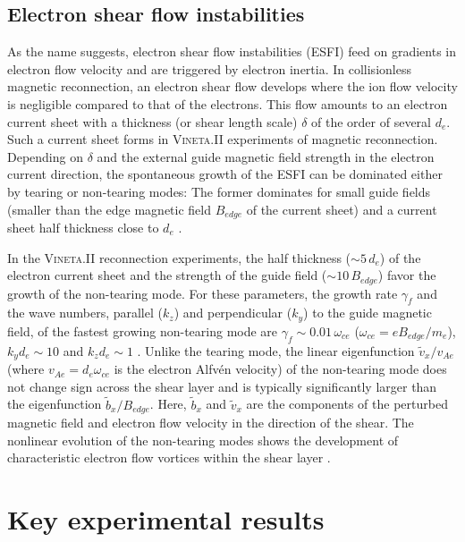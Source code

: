 \documentclass[aip,preprint]{revtex4-1}
\begin{document}
\subsection{Electron shear flow instabilities}
As the name suggests, electron shear flow instabilities (ESFI) feed on gradients in electron flow velocity and are triggered by electron inertia. In collisionless magnetic reconnection, 
an electron shear flow develops where the ion flow velocity is negligible compared to that of the electrons. This flow amounts to an electron current sheet with a thickness (or shear length scale) $\delta$ of the order of several $d_e$.
Such a current sheet forms in \textsc{Vineta.II} experiments of magnetic reconnection. 
Depending on $\delta$ and the external guide magnetic field strength in the electron current direction, the spontaneous growth of the ESFI can be dominated either by tearing or non-tearing modes: The former dominates for small guide fields (smaller than the edge magnetic field $B_{edge}$ of the current sheet) and a current sheet half thickness close to $d_e$ \cite{jain2015}.

In the \textsc{Vineta.II} reconnection experiments, the half thickness ($\sim 5\,d_e$) of the electron current sheet and the strength of the guide field ($\sim 10\, B_{edge}$) favor the growth of the non-tearing mode. For these parameters, the growth rate $\gamma_f$ and the wave numbers, parallel ($k_z$) and perpendicular ($k_y$) to the guide magnetic field,  of the fastest growing non-tearing mode are  $\gamma_f \sim 0.01\,\omega_{ce}$ ($\omega_{ce}=eB_{edge}/m_e$), $k_yd_e\sim 10$ and $k_zd_e\sim 1$ \cite{jain2015}. Unlike the tearing mode, the linear eigenfunction $\tilde{v}_x/v_{Ae}$ (where $v_{Ae}=d_e\omega_{ce}$ is the electron Alfv\'en velocity) of the non-tearing mode does not change sign across the shear layer and is typically significantly larger than the eigenfunction $\tilde{b}_x/B_{edge}$. Here, $\tilde{b}_x$ and $\tilde{v}_x$ are the components of the perturbed magnetic field and electron flow velocity in the direction of the shear. 
The nonlinear evolution of the non-tearing modes shows the development of characteristic electron flow vortices within the shear layer \cite{jain2017}.

\section{Key experimental results}
\label{sec:keyresults}
\end{document}
